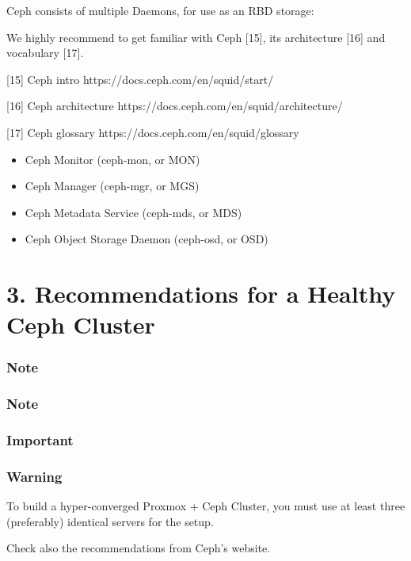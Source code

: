 Ceph consists of multiple Daemons, for use as an RBD storage:

We highly recommend to get familiar with Ceph [15], its architecture [16] and vocabulary [17].

[15] Ceph intro https://docs.ceph.com/en/squid/start/

[16] Ceph architecture https://docs.ceph.com/en/squid/architecture/

[17] Ceph glossary https://docs.ceph.com/en/squid/glossary

\begin{itemize}[leftmargin=2cm]

	\item Ceph Monitor (ceph-mon, or MON)

	\item Ceph Manager (ceph-mgr, or MGS)

	\item Ceph Metadata Service (ceph-mds, or MDS)

	\item Ceph Object Storage Daemon (ceph-osd, or OSD)

\end{itemize}


\section{3. Recommendations for a Healthy Ceph Cluster}

\subsubsection{Note}

\subsubsection{Note}

\subsubsection{Important}

\subsubsection{Warning}

To build a hyper-converged Proxmox + Ceph Cluster, you must use at least three (preferably) identical servers for the setup.

Check also the recommendations from Ceph’s website.

